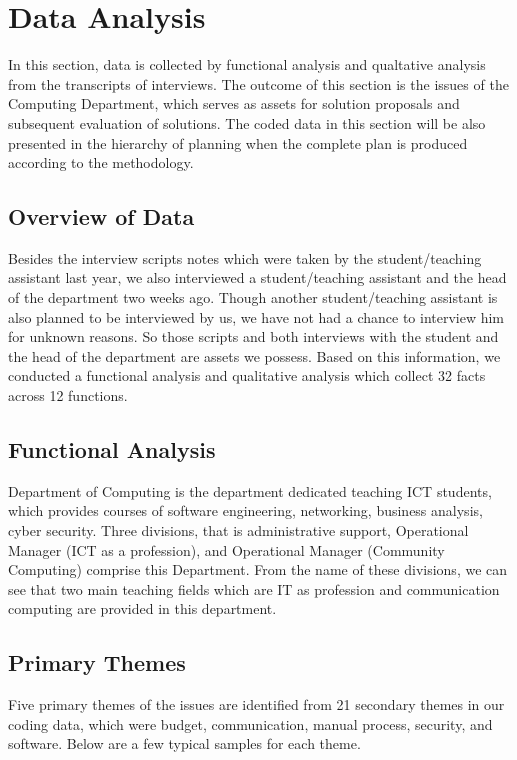 
\section{Data Analysis}

In this section, data is collected by functional analysis and qualtative analysis from the transcripts of interviews. The outcome of this section is the issues of the Computing Department, which serves as assets for solution proposals and subsequent evaluation of solutions. The coded data in this section will be also presented in the hierarchy of planning when the complete plan is produced according to the methodology.

\subsection{Overview of Data}

Besides the interview scripts notes which were taken by the student/teaching assistant last year, we also interviewed a student/teaching assistant and the head of the department two weeks ago. Though another student/teaching assistant is also planned to be interviewed by us, we have not had a chance to interview him for unknown reasons. So those scripts and both interviews with the student and the head of the department are assets we possess. Based on this information, we conducted a functional analysis and qualitative analysis which collect 32 facts across 12 functions.

\subsection{Functional Analysis}

Department of Computing is the department dedicated teaching ICT students, which provides courses of software engineering, networking, business analysis, cyber security. Three divisions, that is administrative support, Operational Manager (ICT as a profession), and Operational Manager (Community Computing) comprise this Department. From the name of these divisions, we can see that two main teaching fields which are IT as profession and communication computing are provided in this department.

\subsection{Primary Themes}
Five primary themes of the issues are identified from 21 secondary themes in our coding data, which were budget, communication, manual process, security, and software. Below are a few typical samples for each theme.

